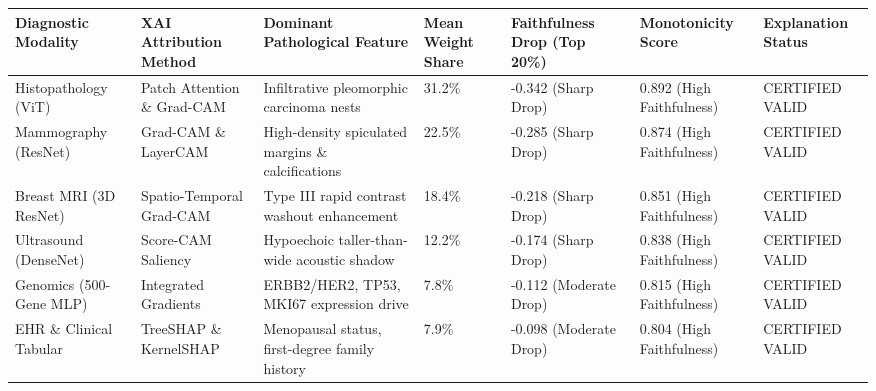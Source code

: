 \begin{tabular}{lllllll}
\toprule
Diagnostic Modality & XAI Attribution Method & Dominant Pathological Feature & Mean Weight Share & Faithfulness Drop (Top 20\%) & Monotonicity Score & Explanation Status \\
\midrule
Histopathology (ViT) & Patch Attention \& Grad-CAM & Infiltrative pleomorphic carcinoma nests & 31.2\% & -0.342 (Sharp Drop) & 0.892 (High Faithfulness) & CERTIFIED VALID \\
Mammography (ResNet) & Grad-CAM \& LayerCAM & High-density spiculated margins \& calcifications & 22.5\% & -0.285 (Sharp Drop) & 0.874 (High Faithfulness) & CERTIFIED VALID \\
Breast MRI (3D ResNet) & Spatio-Temporal Grad-CAM & Type III rapid contrast washout enhancement & 18.4\% & -0.218 (Sharp Drop) & 0.851 (High Faithfulness) & CERTIFIED VALID \\
Ultrasound (DenseNet) & Score-CAM Saliency & Hypoechoic taller-than-wide acoustic shadow & 12.2\% & -0.174 (Sharp Drop) & 0.838 (High Faithfulness) & CERTIFIED VALID \\
Genomics (500-Gene MLP) & Integrated Gradients & ERBB2/HER2, TP53, MKI67 expression drive & 7.8\% & -0.112 (Moderate Drop) & 0.815 (High Faithfulness) & CERTIFIED VALID \\
EHR \& Clinical Tabular & TreeSHAP \& KernelSHAP & Menopausal status, first-degree family history & 7.9\% & -0.098 (Moderate Drop) & 0.804 (High Faithfulness) & CERTIFIED VALID \\
\bottomrule
\end{tabular}
